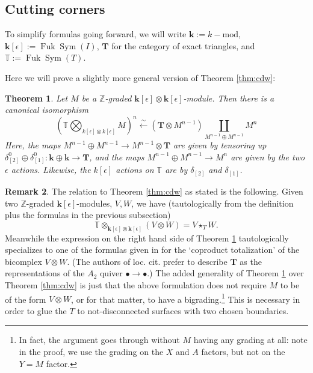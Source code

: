 \documentclass{article}
\def\Z{\mathbb{Z}}
\DeclareMathOperator{\Sym}{Sym}
\DeclareMathOperator{\Fuk}{Fuk}
\newtheorem{theorem}{Theorem}[section]
\theoremstyle{definition}
\newtheorem{remark}[theorem]{Remark}
\begin{document}
\subsection{Cutting corners}


To simplify formulas going forward, we will write $\mathbf{k}:= k-\mathrm{mod}$, $\mathbf{k}[\epsilon] := \Fuk\Sym(I)$,  $\mathbf{T}$ for the category of exact triangles, and $\mathbb{T}:= \Fuk\Sym(T)$.

Here we will prove a slightly more general version of Theorem \ref{thm:cdw}:

\begin{theorem} \label{thm:tensor to pushout}
Let $M$ be a $\Z$-graded $\mathbf{k}[\epsilon] \otimes \mathbf{k}[\epsilon]$-module.  Then there is a canonical isomorphism
$$\left(\mathbb{T} \bigotimes_{k[\epsilon] \otimes k[\epsilon]} M\right)^n \xleftarrow{\sim} ( \mathbf{T} \otimes M^{n-1}) \!\!\!\!\! \coprod_{M^{n-1} \oplus M^{n-1}} \!\!\!\!\! M^n$$
Here, the maps $M^{n-1} \oplus M^{n-1} \to M^{n-1} \otimes \mathbf{T}$ are given by tensoring up  $\delta^0_{[2]} \oplus \delta^0_{[1]}: \mathbf{k} \oplus \mathbf{k} \to \mathbf{T}$, and the maps $M^{n-1} \oplus M^{n-1} \to M^n$ are given by the two $\epsilon$ actions.  Likewise, the $k[\epsilon]$ actions on $\mathbb{T}$ are by $\delta_{[2]}$ and $\delta_{[1]}$. 
\end{theorem}
\begin{remark}
    The relation to Theorem \ref{thm:cdw} as stated is the following.  Given two $\Z$-graded $\mathbf{k}[\epsilon]$-modules, $V, W$, we have (tautologically from the definition plus the formulas in the previous subsection) $$\mathbb{T} \otimes_{\mathbf{k}[\epsilon] \otimes \mathbf{k}[\epsilon]} (V \otimes W) = V \star_T W.$$ Meanwhile the expression on the right hand side of Theorem \ref{thm:tensor to pushout} tautologically specializes to one of the formulas given in \cite[p. 22, p. 26]{Christ-Dyckerhoff-Walde}  for the `coproduct totalization' of the bicomplex $V \otimes W$. (The authors of loc. cit. prefer to describe $\mathbf{T}$ as the representations of the $A_2$ quiver $\bullet \to \bullet$.) 
    The added generality of Theorem \ref{thm:tensor to pushout} over Theorem \ref{thm:cdw} is just that the above formulation does not require $M$ to be of the form $V \otimes W$, or for that matter, to have a bigrading.\footnote{In fact, the argument goes through without $M$ having any grading at all: note in the proof, we use the grading on the $X$ and $A$ factors, but not on the $Y=M$ factor.} This is necessary in order to glue the $T$ to not-disconnected surfaces with two chosen boundaries.
\end{remark}
\end{document}
